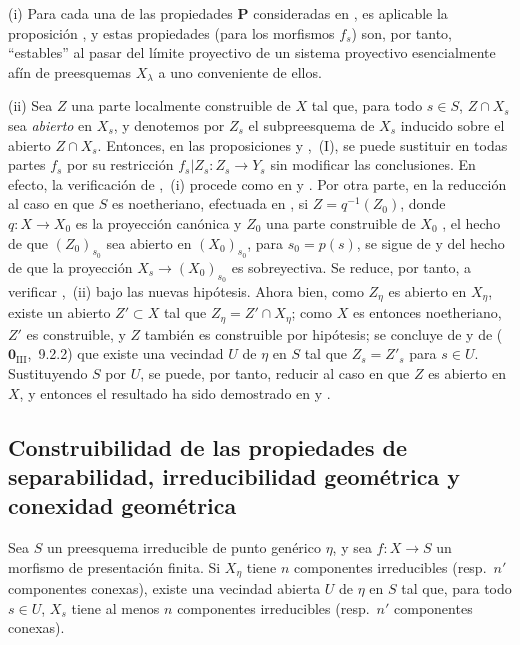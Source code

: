 \begin{remarks}[9.6.7]
\label{IV.9.6.7}
(i) Para cada una de las propiedades $\boldsymbol{P}$ consideradas en , es aplicable la proposición , y estas propiedades (para los morfismos $f_s$) son, por tanto, ``estables'' al pasar del límite proyectivo de un sistema proyectivo esencialmente afín  de preesquemas $X_\lambda$ a uno conveniente de ellos.

(ii) Sea $Z$ una parte localmente construible de $X$ tal que, para todo $s\in S$, $Z\cap X_s$ sea \emph{abierto} en $X_s$, y denotemos por $Z_s$ el subpreesquema de $X_s$ inducido sobre el abierto $Z\cap X_s$.
Entonces, en las proposiciones  y ,~(I), se puede sustituir en todas partes $f_s$ por su restricción $f_s|Z_s:Z_s\to Y_s$ sin modificar las conclusiones.
En efecto, la verificación de ,~(i) procede como en  y .
Por otra parte, en la reducción al caso en que $S$ es noetheriano, efectuada en , si $Z=q^{-1}(Z_0)$, donde $q:X\to X_0$ es la proyección canónica y $Z_0$ una parte construible de $X_0$ , el hecho de que $(Z_0)_{s_0}$ sea abierto en $(X_0)_{s_0}$, para $s_0=p(s)$, se sigue de  y del hecho de que la proyección $X_s\to(X_0)_{s_0}$ es sobreyectiva.
Se reduce, por tanto, a verificar ,~(ii) bajo las nuevas hipótesis.
Ahora bien, como $Z_\eta$ es abierto en $X_\eta$, existe un abierto $Z'\subset X$ tal que $Z_\eta=Z'\cap X_\eta$; como $X$ es entonces noetheriano, $Z'$ es construible, y $Z$ también es construible por hipótesis; se concluye de  y de ($\mathbf 0_{\mathrm{III}}$,~9.2.2) que existe una vecindad $U$ de $\eta$ en $S$ tal que $Z_s=Z'_s$ para $s\in U$.
Sustituyendo $S$ por $U$, se puede, por tanto, reducir al caso en que $Z$ es abierto en $X$, y entonces el resultado ha sido demostrado en  y .
\end{remarks}

\subsection{Construibilidad de las propiedades de separabilidad, irreducibilidad geométrica y conexidad geométrica}
\label{subsection:IV.9.7}
\label{IV.9.7}

\begin{lemma}[9.7.1]
\label{IV.9.7.1}
Sea $S$ un preesquema irreducible de punto genérico $\eta$, y sea $f:X\to S$ un morfismo de presentación finita.
Si $X_\eta$ tiene $n$ componentes irreducibles (\textup{resp.}\ $n'$ componentes conexas), existe una vecindad abierta $U$ de $\eta$ en $S$ tal que, para todo $s\in U$, $X_s$ tiene al menos $n$ componentes irreducibles (\textup{resp.}\ $n'$ componentes conexas).
\end{lemma}

